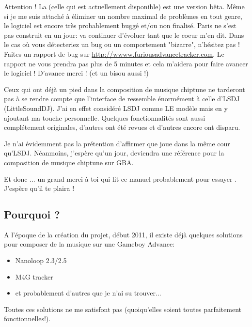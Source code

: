 \documentclass[12pt,a4paper]{article}
\begin{document}
    Attention ! La \fatversion (celle qui est actuellement disponible) est une version bêta.
    Même si je me suis attaché à éliminer un nombre maximal de problèmes en tout genre, le logiciel est encore très probablement buggé et/ou non finalisé.
    Paris ne s'est pas construit en un jour: \FAT va continuer d'évoluer tant que le coeur m'en dit.
    Dans le cas où vous détecteriez un bug ou un comportement "bizarre", n'hésitez pas !
    Faites un rapport de bug sur \url{http://wwww.furiousadvancetracker.com}.
    Le rapport ne vous prendra pas plus de 5 minutes et cela m'aidera pour faire avancer le logiciel !
    D'avance merci ! (et un bisou aussi !)
    \medskip
    
    Ceux qui ont déjà un pied dans la composition de musique chiptune ne tarderont pas à se rendre compte que l'interface de \FAT ressemble énormément à celle d'LSDJ (LittleSoundDJ).
    J'ai en effet considéré LSDJ comme LE modèle mais en y ajoutant ma touche personnelle.
    Quelques fonctionnalités sont aussi complétement originales, d'autres ont été revues et d'autres encore ont disparu.
    \medskip
    
    Je n'ai évidemment pas la prétention d'affirmer que \FAT joue dans la même cour qu'LSDJ.
    Néanmoins, j'espère qu'un jour, \FAT deviendra une référence pour la composition de musique chiptune sur GBA.\medskip
    
    Et donc ... un grand merci à toi qui lit ce manuel probablement pour essayer \FAT. J'espère qu'il te plaira !
  
    \subsection{Pourquoi \FAT ?}
    A l'époque de la création du projet, début 2011, il existe déjà quelques solutions pour composer de la musique sur une Gameboy Advance:
    \medskip
    
    \begin{itemize}
        \item{Nanoloop 2.3/2.5}
        \item{M4G tracker}
        \item{et probablement d'autres que je n'ai su trouver...}
    \end{itemize}\medskip
    
    Toutes ces solutions ne me satisfont pas (quoiqu'elles soient toutes parfaitement fonctionnelles!).
    \medskip
    
\end{document}
